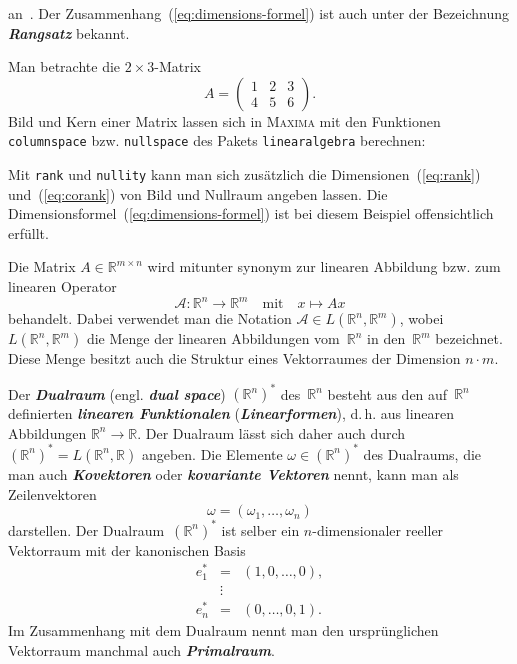 an~\cite{lorenz1992,beutelspacher2001}.
Der Zusammenhang~(\ref{eq:dimensions-formel})
ist auch unter der Bezeichnung \textbf{\em Rangsatz} bekannt.
\begin{example}
\label{exa:Bild-und-Kern}Man betrachte die $2\times3$-Matrix
\[
A=\left(\begin{array}{ccc}
1 & 2 & 3\\
4 & 5 & 6
\end{array}\right).
\]
Bild und Kern einer Matrix lassen sich in \textsc{Maxima} mit den
Funktionen \texttt{columnspace} bzw. \texttt{nullspace} des Pakets
\texttt{linearalgebra} berechnen:



Mit \texttt{rank} und \texttt{nullity} kann man sich zusätzlich die
Dimensionen~(\ref{eq:rank}) und~(\ref{eq:corank}) von Bild und
Nullraum angeben lassen. Die Dimensionsformel~(\ref{eq:dimensions-formel})
ist bei diesem Beispiel offensichtlich erfüllt.

\end{example}
Die Matrix $A\in{\mathbb{R}}^{m\times n}$ wird mitunter synonym zur linearen
Abbildung bzw. zum linearen Operator
\[
\mathcal{A}:{\mathbb{R}}^{n}\to{\mathbb{R}}^{m}\quad\text{mit}\quad x\mapsto Ax
\]
behandelt. Dabei verwendet man die Notation $\mathcal{A}\in L({\mathbb{R}}^{n},{\mathbb{R}}^{m})$,
wobei $L({\mathbb{R}}^{n},{\mathbb{R}}^{m})$ die Menge der linearen Abbildungen vom~${\mathbb{R}}^{n}$
in den~${\mathbb{R}}^{m}$ bezeichnet. Diese Menge besitzt auch die Struktur
eines Vektorraumes der Dimension $n\cdot m$.

Der \textbf{\em Dualraum} (engl. \textbf{\em dual space}) $({\mathbb{R}}^{n})^{*}$
des~${\mathbb{R}}^{n}$ besteht aus den auf~${\mathbb{R}}^{n}$ definierten \textbf{\em linearen
Funktionalen} (\textbf{\em Linearformen}), d.\,h. aus linearen Abbildungen
${\mathbb{R}}^{n}\to{\mathbb{R}}$. Der Dualraum lässt sich daher auch durch $({\mathbb{R}}^{n})^{*}=L({\mathbb{R}}^{n},{\mathbb{R}})$
angeben. Die Elemente $\omega\in({\mathbb{R}}^{n})^{*}$ des Dualraums, die
man auch \textbf{\em Kovektoren} oder \textbf{\em kovariante
Vektoren} nennt, kann man als Zeilenvektoren
\[
\omega=\left(\omega_{1},\ldots,\omega_{n}\right)
\]
darstellen. Der Dualraum~$({\mathbb{R}}^{n})^{*}$ ist selber ein $n$-dimensionaler
reeller Vektorraum mit der kanonischen Basis
\[
\begin{array}{lcl}
e_{1}^{*} & = & \left(1,0,\ldots,0\right),\\
 & \vdots\\
e_{n}^{*} & = & (0,\ldots,0,1).
\end{array}
\]
Im Zusammenhang mit dem Dualraum nennt man den ursprünglichen Vektorraum
manchmal auch \textbf{\em Primalraum}.

